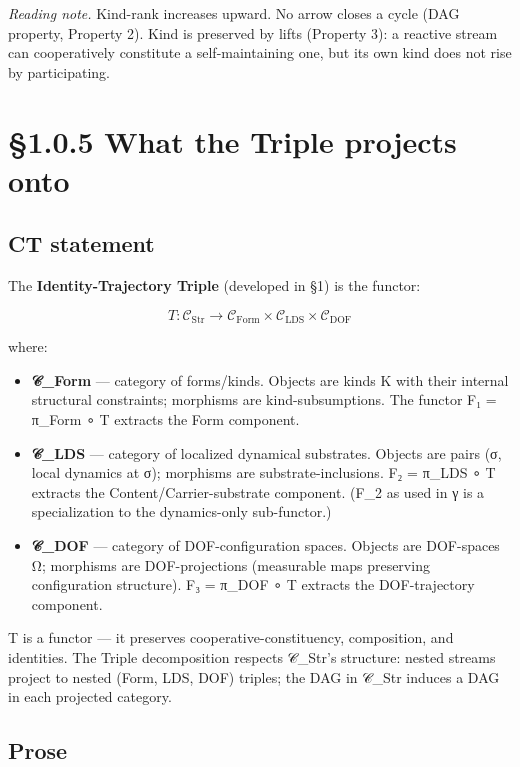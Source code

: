 \documentclass[11pt, openany]{book}
\newcommand{\sectionbreak}{\clearpage}
\begin{document}
\textit{Reading note.} Kind-rank increases upward. No arrow closes a cycle (DAG property, Property 2). Kind is preserved by lifts (Property 3): a reactive stream can cooperatively constitute a self-maintaining one, but its own kind does not rise by participating.

\sectionbreak

\section{§1.0.5 What the Triple projects onto}

\subsection{CT statement}

The \textbf{Identity-Trajectory Triple} (developed in §1) is the functor:

$$T : \mathcal{C}_{\text{Str}} \to \mathcal{C}_{\text{Form}} \times \mathcal{C}_{\text{LDS}} \times \mathcal{C}_{\text{DOF}}$$

where:

\begin{itemize}
\item \textbf{𝒞\_\allowbreak{}Form} --- category of forms/kinds. Objects are kinds K with their internal structural constraints; morphisms are kind-subsumptions. The functor F₁ = π\_\allowbreak{}Form ∘ T extracts the Form component.
\item \textbf{𝒞\_\allowbreak{}LDS} --- category of localized dynamical substrates. Objects are pairs (σ, local dynamics at σ); morphisms are substrate-inclusions. F₂ = π\_\allowbreak{}LDS ∘ T extracts the Content/Carrier-substrate component. (F\_\allowbreak{}2 as used in γ is a specialization to the dynamics-only sub-functor.)
\item \textbf{𝒞\_\allowbreak{}DOF} --- category of DOF-configuration spaces. Objects are DOF-spaces Ω; morphisms are DOF-projections (measurable maps preserving configuration structure). F₃ = π\_\allowbreak{}DOF ∘ T extracts the DOF-trajectory component.
\end{itemize}

T is a functor --- it preserves cooperative-constituency, composition, and identities. The Triple decomposition respects 𝒞\_\allowbreak{}Str's structure: nested streams project to nested (Form, LDS, DOF) triples; the DAG in 𝒞\_\allowbreak{}Str induces a DAG in each projected category.

\subsection{Prose}
\end{document}
